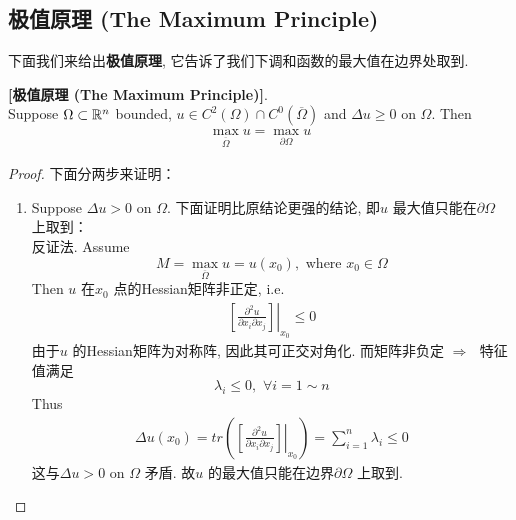 \newpage

\subsection{极值原理 (The Maximum Principle)}
	下面我们来给出\textbf{极值原理}, 它告诉了我们下调和函数的最大值在边界处取到. 
	
	\vspace{1em}
	
	\begin{thm}\label{thm 3.4.2}
		\textbf{[极值原理 (The Maximum Principle)]}. \\
		Suppose $\Omega \subset \mathbb{R}^n$ bounded, $u \in C^2(\Omega) \cap C^0 \left( \overline{\Omega} \right)$ and $\Delta u \geq 0$ on $\Omega$. Then
		\begin{align*}
			\max_{\overline{\Omega}} u = \max_{\partial \Omega} u
		\end{align*}
		
		\vspace{2em}
		
		\begin{proof}
			下面分两步来证明：
			\begin{enumerate}
				\item Suppose $\Delta u > 0$ on $\Omega$. 下面证明比原结论更强的结论, 即$u$ 最大值只能在$\partial \Omega$ 上取到：\\
				反证法. Assume 
				\[ M = \max_{\overline{\Omega}}u = u(x_0) , \,\, \text{where} \,\, x_0 \in \Omega \]
				Then $u$ 在$x_0$ 点的Hessian矩阵非正定, i.e.
				\begin{align*}
					\left. [ \frac{\partial^2 u}{\partial x_i \partial x_j} ] \right|_{x_0} \leq 0
				\end{align*}
				由于$u$ 的Hessian矩阵为对称阵, 因此其可正交对角化. 而矩阵非负定$\,\, \Rightarrow \,\,$ 特征值满足
				\[ \lambda_i \leq 0 , \,\, \forall i = 1 \sim n \]
				Thus
				\begin{align*}
					\Delta u(x_0) 
					= tr \left( \left. [ \frac{\partial^2 u}{\partial x_i \partial x_j} ] \right|_{x_0} \right) 
					= \sum_{i = 1}^n \lambda_i \leq 0
				\end{align*}
				这与$\Delta u > 0$ on $\Omega$ 矛盾. 故$u$ 的最大值只能在边界$\partial \Omega$ 上取到. 
				
				\vspace{2em}
				

\end{enumerate}
\end{proof}
\end{thm}
